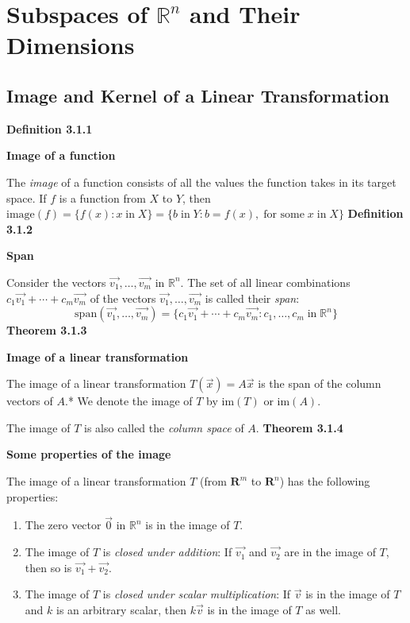 \section{Subspaces of \texorpdfstring{$\mathbb{R}^{n}$}{R^n} and Their Dimensions}

\subsection{Image and Kernel of a Linear Transformation}
\textbf{Definition 3.1.1}\\
\par\noindent\textbf{Image of a function}
\par\noindent The \textit{image} of a function consists of all the values the function takes in its target space. If $f$ is a function from $X$ to $Y$, then $\textrm{image}(f)=\{f(x):x\;{}\textrm{in}\;{}X\}=\{b\;\textrm{in}\;{}Y:b=f(x),\;{}\textrm{for some}\;{}x\;{}\textrm{in}\;{}X\}$
\textbf{Definition 3.1.2}\\
\par\noindent\textbf{Span}
\par\noindent Consider the vectors $\vec{v_{1}},\ldots{},\vec{v_{m}}$ in $\mathbb{R}^{n}$. The set of all linear combinations $c_{1}\vec{v_{1}}+\cdots{}+c_{m}\vec{v_{m}}$ of the vectors $\vec{v_{1}},\ldots{},\vec{v_{m}}$ is called their \textit{span}:
\[\textrm{span}(\vec{v_{1}},\ldots{},\vec{v_{m}})=\{c_{1}\vec{v_{1}}+\cdots{}+c_{m}\vec{v_{m}}:c_{1},\ldots{},c_{m}\;\textrm{in}\;\mathbb{R}^{n}\}\]
\textbf{Theorem 3.1.3}\\
\par\noindent\textbf{Image of a linear transformation}
\par\noindent The image of a linear transformation $T(\vec{x})=A\vec{x}$ is the span of the column vectors of $A$.* We denote the image of $T$ by $\textrm{im}(T)$ or $\textrm{im}(A)$.
\par\noindent *The image of $T$ is also called the \textit{column space} of $A$.
\textbf{Theorem 3.1.4}\\
\par\noindent\textbf{Some properties of the image}
\par\noindent The image of a linear transformation $T$ (from $\textbf{R}^{m}$ to $\textbf{R}^{n}$) has the following properties:
\renewcommand{\labelenumi}{\textbf{\alph{enumi}.}}
\begin{enumerate}
\item The zero vector $\vec{0}$ in $\mathbb{R}^{n}$ is in the image of $T$.
\item The image of $T$ is \textit{closed under addition}: If $\vec{v_{1}}$ and $\vec{v_{2}}$ are in the image of $T$, then so is $\vec{v_{1}}+\vec{v_{2}}$.
\item The image of $T$ is \textit{closed under scalar multiplication}: If $\vec{v}$ is in the image of $T$ and $k$ is an arbitrary scalar, then $k\vec{v}$ is in the image of $T$ as well.
\end{enumerate}
